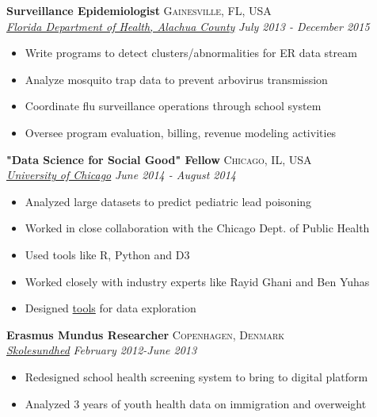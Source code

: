 \documentclass[11pt]{article}
\begin{document}
\noindent \textbf{Surveillance Epidemiologist} \hfill \textsc{Gainesville, FL, USA}\\
\noindent \emph{\href{http://alachua.floridahealth.gov/}{Florida Department of Health, Alachua County}} \hfill \emph{July 2013 - December 2015}
\vspace{-2mm}
\begin{itemize}\itemsep0pt \parskip0pt 
\item Write programs to detect clusters/abnormalities for ER data stream
\item Analyze mosquito trap data to prevent arbovirus transmission
\item Coordinate flu surveillance operations through school system
\item Oversee program evaluation, billing, revenue modeling activities
\end{itemize}


\noindent \textbf{"Data Science for Social Good" Fellow} \hfill \textsc{Chicago, IL, USA}\\
\noindent \emph{\href{http://www.uchicago.edu/}{University of Chicago}} \hfill \emph{June 2014 - August 2014}
\vspace{-2mm}
\begin{itemize}\itemsep0pt \parskip0pt 
\item Analyzed large datasets to predict pediatric lead poisoning
\item Worked in close collaboration with the Chicago Dept. of Public Health
\item Used tools like R, Python and D3
\item Worked closely with industry experts like Rayid Ghani and Ben Yuhas
\item Designed \href{http://spark.rstudio.com/joebrew/cdph/}{tools} for data exploration
\end{itemize}


\noindent \textbf{Erasmus Mundus Researcher} \hfill \textsc{Copenhagen, Denmark}\\
\noindent \emph{\href{https://www.skolesundhed.dk/Default.aspx}{Skolesundhed}} \hfill \emph{February 2012-June 2013}
\vspace{-2mm}
\begin{itemize}\itemsep0pt \parskip0pt 
\item Redesigned school health screening system to bring to digital platform 
\item Analyzed 3 years of youth health data on immigration and overweight
\end{itemize}
\end{document}
